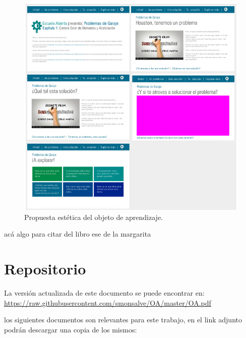 \documentclass[twoside,letterpaper,12pt]{report}
\begin{document}
\begin{figure}[h!]
\label{propuesta}
\centering
\includegraphics[width=1\textwidth]{aux/propuestaEstetica}
\caption{Propuesta estética del objeto de aprendizaje.}
\end{figure}

acá algo para citar del libro ese de la margarita\cite{5seg}





\newpage

\appendix
\chapter{Repositorio}

La versión actualizada de este documento se puede encontrar en:\\
 \url{https://raw.githubusercontent.com/smonsalve/OA/master/OA.pdf}

los siguientes documentos son relevantes para este trabajo, en el link adjunto podrán descargar una copia de los mismos:
\end{document}

